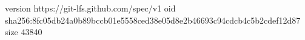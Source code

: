 version https://git-lfs.github.com/spec/v1
oid sha256:8fc05db24a0b89bccb01e5558ced38e05d8e2b46693c94cdcb4c5b2cdef12d87
size 43840
